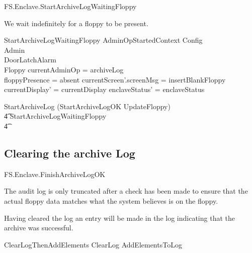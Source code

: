 \begin{traceunit}{FS.Enclave.StartArchiveLogWaitingFloppy}
\end{traceunit}


We wait indefinitely for a floppy to be present.

\begin{schema}{StartArchiveLogWaitingFloppy}
        AdminOpStartedContext
\also   
        \Xi Config
\\      \Xi Admin 
\\      \Xi DoorLatchAlarm    
\\      \Xi Floppy
\where
        \The currentAdminOp = archiveLog
\\      floppyPresence = absent
\also
        currentScreen'.screenMsg = insertBlankFloppy
\\      currentDisplay' = currentDisplay
\also
        enclaveStatus' = enclaveStatus
\end{schema}

\begin{zed}
        StartArchiveLog  (StartArchiveLogOK \semi UpdateFloppy) 
\\ \t4                  \lor StartArchiveLogWaitingFloppy
\\ \t4  \lor
        [~ BadAdminLogout | enclaveStatus = waitingStartAdminOp 
\\ \t6                          \land \The currentAdminOp = archiveLog 
                                ~]
\end{zed}


\subsection{Clearing the archive Log}

\begin{traceunit}{FS.Enclave.FinishArchiveLogOK}
\end{traceunit}

The audit log is only truncated after a check has been made to ensure
that the actual floppy data matches what the system believes is on the
floppy. 

Having cleared the log an entry will be made in the log indicating
that the archive was successful.

\begin{zed}
        ClearLogThenAddElements  ClearLog \semi AddElementsToLog
\end{zed}


